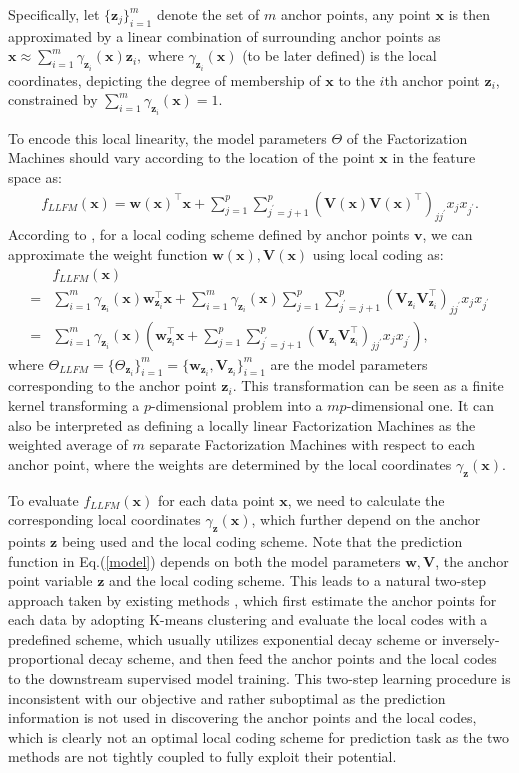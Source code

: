 \documentclass{article}
\def \x {\mathbf{x}}
\def \w {\mathbf{w}}
\def \v {\mathbf{v}}
\def \V {\mathbf{V}}
\def \z {\mathbf{z}}
\begin{document}
Specifically, let $\{\z_j\}_{i=1}^m$ denote the set of $m$ anchor points, any point $\x$ is then approximated by a linear combination of surrounding anchor points as $
\x \approx \sum^m_{i=1}\gamma_{\z_i}(\x)\z_i,$
where $\gamma_{\z_i}(\x)$ (to be later defined) is the local coordinates, depicting the degree of membership of $\x$ to the $i$th anchor point $\z_i$, constrained by $\sum^m_{i=1}\gamma_{\z_i}(\x)=1$.

To encode this local linearity, the model parameters $\Theta$ of the Factorization Machines should vary according to the location of the point $\x$ in the feature space as:
\begin{align}
f_{LLFM}(\x)
= \w(\x)^\top\x+\sum^p_{j=1}\sum^p_{j^\prime=j+1}(\V(\x)\V(\x)^\top)_{jj^\prime}x_jx_{j^\prime}.
\end{align}
According to \cite{yu2009nonlinear,ladicky2011locally}, for a local coding scheme defined by anchor points $\v$, we can approximate the weight function $\w(\x),\V(\x)$ using local coding as:
\begin{align}
\label{model}
&f_{LLFM}(\x) \nonumber\\
=&\sum^m_{i=1}\gamma_{\z_i}(\x)\w_{\z_i}^\top\x+\sum^m_{i=1}\gamma_{\z_i}(\x)\sum^p_{j=1}\sum^p_{j^\prime=j+1}(\V_{\z_i}\V_{\z_i}^\top)_{jj^\prime}x_jx_{j^\prime} \nonumber \\
=&\sum^m_{i=1}\gamma_{\z_i}(\x)\left(\w_{\z_i}^\top\x+\sum^p_{j=1}\sum^p_{j^\prime=j+1}(\V_{\z_i}\V_{\z_i}^\top)_{jj^\prime}x_jx_{j^\prime}\right),
\end{align}
where $\Theta_{LLFM}=\{\Theta_{\z_i}\}^m_{i=1}=\{\w_{\z_i},\V_{\z_i}\}^m_{i=1}$ are the model parameters corresponding to the anchor point $\z_i$. This transformation can be seen as a finite kernel transforming a $p$-dimensional problem into a $mp$-dimensional one. It can also be interpreted as defining a locally linear Factorization Machines as the weighted average of $m$ separate Factorization Machines
with respect to each anchor point, where the weights are determined by the local coordinates $\gamma_{\z}(\x)$.

To evaluate $f_{LLFM}(\x)$ for each data point $\x$, we need to calculate the corresponding local coordinates $\gamma_{\z}(\x)$, which further depend on the anchor points $\z$ being used and the local coding scheme. Note that the prediction function in Eq.(\ref{model}) depends on both the model parameters $\w, \V$, the anchor point variable $\z$ and the local coding scheme. This leads to a natural two-step approach taken by existing methods \cite{ladicky2011locally,yu2009nonlinear}, which first estimate the anchor points for each data by adopting K-means clustering and evaluate the local codes with a predefined scheme, which usually utilizes exponential decay scheme or inversely-proportional decay scheme, and then feed the anchor points and the local codes to the downstream supervised model training. This two-step learning procedure is inconsistent
with our objective and rather suboptimal as the prediction information is not used in discovering the anchor points and the local codes, which is clearly not an optimal local coding scheme for prediction task as the two methods are not tightly coupled to fully exploit their potential.
\end{document}
